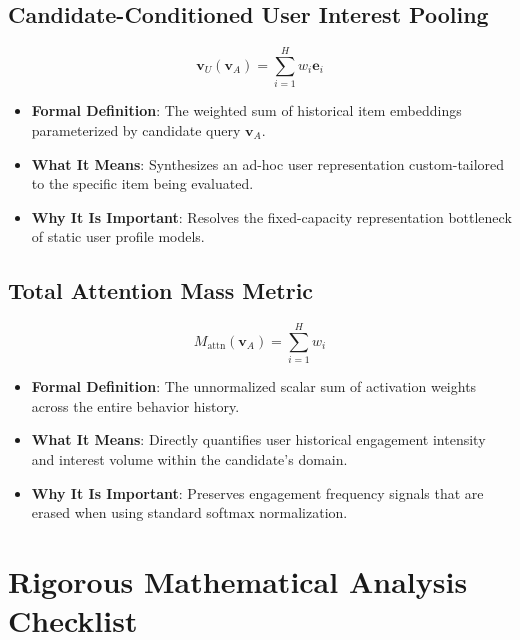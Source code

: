 \documentclass[11pt,a4paper]{article}
\theoremstyle{definition}
\begin{document}
\subsection{Candidate-Conditioned User Interest Pooling}
{\boldmath
\begin{equation}
\mathbf{v}_U(\mathbf{v}_A) = \sum_{i=1}^H w_i \mathbf{e}_i
\end{equation}
}
\begin{itemize}
    \item \textbf{Formal Definition}: The weighted sum of historical item embeddings parameterized by candidate query $\mathbf{v}_A$.
    \item \textbf{What It Means}: Synthesizes an ad-hoc user representation custom-tailored to the specific item being evaluated.
    \item \textbf{Why It Is Important}: Resolves the fixed-capacity representation bottleneck of static user profile models.
\end{itemize}

\subsection{Total Attention Mass Metric}
{\boldmath
\begin{equation}
M_{\text{attn}}(\mathbf{v}_A) = \sum_{i=1}^H w_i
\end{equation}
}
\begin{itemize}
    \item \textbf{Formal Definition}: The unnormalized scalar sum of activation weights across the entire behavior history.
    \item \textbf{What It Means}: Directly quantifies user historical engagement intensity and interest volume within the candidate's domain.
    \item \textbf{Why It Is Important}: Preserves engagement frequency signals that are erased when using standard softmax normalization.
\end{itemize}

\section{Rigorous Mathematical Analysis Checklist}
\end{document}
